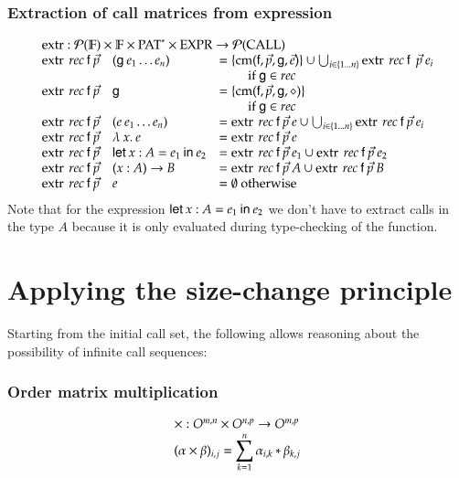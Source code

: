 \subsubsection{Extraction of call matrices from expression}
\[
\begin{array}[t]{ll}
\multicolumn{2}{l}{\extr : \pset{\cF} \times \cF \times \ves{\Pat} \times \Expr \ra \pset{\call}}\\ 
\extr \: rec \: \ff \: \vec{p} \quad (\fg \: e_1 \ldots e_n) & = \{ \cm (\ff,\vec{p},\fg,\vec{e}) \} \cup \bigcup_{i \in \{ 1 \ldots n \}} \extr \: rec \: \ff \: \: \vec{p} \: e_i \\
& \qquad \mbox{ if }  \fg \in rec \\
\extr \: rec \: \ff \: \vec{p} \quad \fg & =  \{ \cm (\ff,\vec{p},\fg,\diamond) \} \\
& \qquad \mbox{ if }  \fg \in rec\\
\extr \: rec \: \ff \: \vec{p} \quad (e \: e_1 \ldots e_n) & =  \extr \: rec \: \ff \: \vec{p} \: e \cup \bigcup_{i \in \{ 1 \ldots n \}} \extr \: rec \: \ff \: \vec{p} \: e_i\\ 
\extr \: rec \: \ff \: \vec{p} \quad \lam{x}e & = \extr \: rec \: \ff \: \vec{p} \: e \\
\extr \: rec \: \ff \: \vec{p} \quad \ELet{x}{A}{e_1}{e_2} & = \extr \: rec \: \ff \: \vec{p} \: e_1 \cup \extr \: rec \: \ff \: \vec{p} \: e_2 \\
\extr \: rec \: \ff \: \vec{p} \quad \EPi{x}{A}{B} & =  \extr \: rec \: \ff \: \vec{p} \: A \cup \extr \: rec \: \ff \: \vec{p} \: B \\ 
\extr \: rec \: \ff \: \vec{p} \quad e & = \emptyset \mbox{ otherwise}   
\end{array}
\]
Note that for the expression $\mathsf{let}\: x : A = e_1 \: \mathsf{in}\:{e_2}$ we don't have to extract calls in the type $A$ because it is only evaluated during type-checking of the function.  

\section{Applying the size-change principle}

Starting from the initial call set, the following allows reasoning about the possibility of infinite call sequences:

\subsubsection{Order matrix multiplication}
\[ 
\begin{array}[t]{l}
\times : O^{m,n} \times O^{n,p} \rightarrow O^{m,p} \\
   (\alpha \times \beta)_{i,j} = \displaystyle\sum^{n}_{k=1}{\alpha_{i,k} * \beta_{k,j}}
\end{array}
\]

